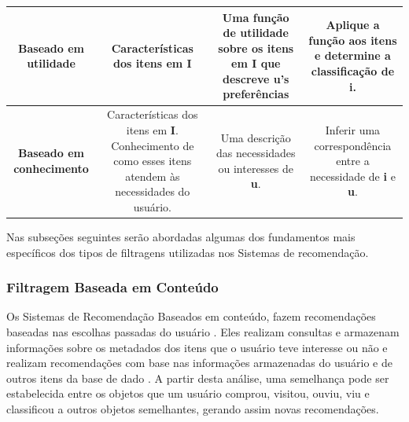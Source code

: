 \begin{table}[]
\begin{tabular}{|c|c|c|c|}
	\rowcolor[HTML]{EFEFEF} 
	\textbf{Baseado em utilidade} & \begin{minipage} [t] {0.2\textwidth} \centering Características dos itens em \textbf{I} \end{minipage}  & \begin{minipage} [t] {0.2\textwidth} 
		Uma função de utilidade sobre os itens em \textbf{I} que descreve \textbf{u}'s preferências \end{minipage}   & \begin{minipage} [t] {0.2\textwidth} Aplique a função aos itens e determine a classificação de \textbf{i}.  \end{minipage}  \\ \hline
	\textbf{Baseado em conhecimento}  & \begin{minipage} [t] {0.2\textwidth} \centering Características dos itens em \textbf{I}. Conhecimento de como esses itens atendem às necessidades do usuário.  \end{minipage}  & \begin{minipage} [t] {0.2\textwidth} Uma descrição das necessidades ou interesses de \textbf{u}.\end{minipage}  &  \begin{minipage} [t] {0.2\textwidth}  
		Inferir uma correspondência entre a necessidade de \textbf{i} e \textbf{u}. \end{minipage} \\ \hline
	\end{tabular}
\end{table}



Nas subseções seguintes serão abordadas algumas dos fundamentos mais específicos dos tipos de filtragens utilizadas nos Sistemas de recomendação.




\subsubsection{Filtragem Baseada em Conteúdo}


Os Sistemas de Recomendação Baseados em conteúdo, fazem recomendações baseadas nas escolhas passadas do usuário \cite{bobadilla2013}. 
Eles realizam consultas e armazenam informações sobre os metadados dos itens que o usuário teve interesse ou não e realizam recomendações 
com base nas informações armazenadas do usuário e de outros itens da base de dado \cite{mauricio}. A partir desta análise, uma semelhança pode ser
estabelecida entre os objetos que um usuário comprou, visitou, ouviu, viu e classificou a outros objetos semelhantes, gerando assim novas recomendações. 

